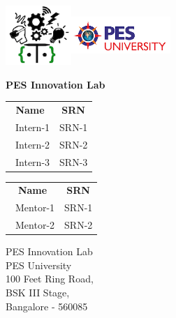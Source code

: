 \documentclass[12pt]{report}
\begin{document}
 

\begin{titlepage}
\includegraphics[height=2.25cm,keepaspectratio]{lab.png}\hfill \includegraphics[height=2.25cm,width = 3.75cm]{pes.png}

\begin{center}
\vspace*{1cm}

\textbf{\Large{PES Innovation Lab}}

\vspace{0.3cm}
\vspace{0.1cm}
       
       
\vspace{0.8cm}
            
\vspace{0.8cm}
       
\vspace{0.2cm}
       
\begin{tabular}{c c}    
    \textbf{Name} & 
    \textbf{SRN} \\[0.5cm]
    \ {Intern-1} & {SRN-1} \\
    \ {Intern-2} & {SRN-2} \\
    \ {Intern-3} & {SRN-3} \\         
\end{tabular}
\vspace{0.5cm}

\vspace{0.2cm}
       
\begin{tabular}{c c}
    \textbf{Name} & 
    \textbf{SRN} \\[0.5cm]
    \ {Mentor-1} & {SRN-1} \\
    \ {Mentor-2} & {SRN-2} \\
\end{tabular}
       
\vfill
\vspace{0.5cm}
            
PES Innovation Lab\\
PES University\\
100 Feet Ring Road,\\
BSK III Stage,\\
Bangalore - 560085
            
\end{center}
\end{titlepage}
\end{document}
